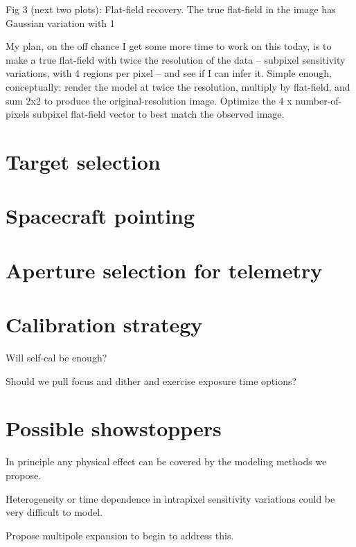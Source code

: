 \documentclass[letterpaper,12pt,preprint]{aastex}
\begin{document}
Fig 3 (next two plots): Flat-field recovery.  The true flat-field in the image has Gaussian variation with 1%

My plan, on the off chance I get some more time to work on this today, is to make a true flat-field with twice the resolution of the data -- subpixel sensitivity variations, with 4 regions per pixel -- and see if I can infer it. Simple enough, conceptually: render the model at twice the resolution, multiply by flat-field, and sum 2x2 to produce the original-resolution image.  Optimize the 4 x number-of-pixels subpixel flat-field vector to best match the observed image.

\section{Target selection}\label{sec:target}

\section{Spacecraft pointing}\label{sec:pointing}

\section{Aperture selection for telemetry}\label{sec:telemetry}

\section{Calibration strategy}\label{sec:calibration}

Will self-cal be enough?

Should we pull focus and dither and exercise exposure time options?

\section{Possible showstoppers}\label{sec:stop}

In principle any physical effect can be covered by the modeling
methods we propose.

Heterogeneity or time dependence in intrapixel sensitivity variations
could be very difficult to model.

Propose multipole expansion to begin to address this.
\end{document}
